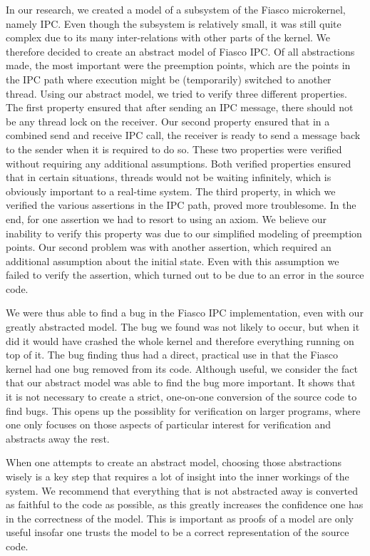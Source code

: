 In our research, we created a model of a subsystem of the Fiasco microkernel, namely IPC. Even though the subsystem is relatively small, it was still quite complex due to its many inter-relations with other parts of the kernel. We therefore decided to create an abstract model of Fiasco IPC. Of all abstractions made, the most important were the preemption points, which are the points in the IPC path where execution might be (temporarily) switched to another thread. Using our abstract model, we tried to verify three different properties. The first property ensured that after sending an IPC message, there should not be any thread lock on the receiver. Our second property ensured that in a combined send and receive IPC call, the receiver is ready to send a message back to the sender when it is required to do so. These two properties were verified without requiring any additional assumptions. Both verified properties ensured that in certain situations, threads would not be waiting infinitely, which is obviously important to a real-time system. The third property, in which we verified the various assertions in the IPC path, proved more troublesome. In the end, for one assertion we had to resort to using an axiom. We believe our inability to verify this property was due to our simplified modeling of preemption points. Our second problem was with another assertion, which required an additional assumption about the initial state. Even with this assumption we failed to verify the assertion, which turned out to be due to an error in the source code.\emptyline

We were thus able to find a bug in the Fiasco IPC implementation, even with our greatly abstracted model. The bug we found was not likely to occur, but when it did it would have crashed the whole kernel and therefore everything running on top of it. The bug finding thus had a direct, practical use in that the Fiasco kernel had one bug removed from its code. Although useful, we consider the fact that our abstract model was able to find the bug more important. It shows that it is not necessary to create a strict, one-on-one conversion of the source code to find bugs. This opens up the possiblity for verification on larger programs, where one only focuses on those aspects of particular interest for verification and abstracts away the rest.\emptyline

When one attempts to create an abstract model, choosing those abstractions wisely is a key step that requires a lot of insight into the inner workings of the system. We recommend that everything that is not abstracted away is converted as faithful to the code as possible, as this greatly increases the confidence one has in the correctness of the model. This is important as proofs of a model are only useful insofar one trusts the model to be a correct representation of the source code.

